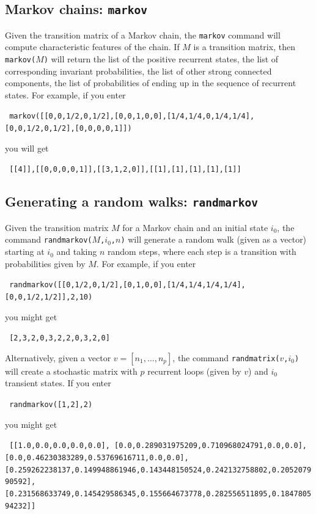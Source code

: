 \documentclass[a4paper,11pt]{book}
\begin{document}
\subsection{Markov chains: \texttt{markov}}

Given the transition matrix of a Markov chain, the \texttt{markov}
command will compute characteristic features of the chain.  If $M$ is
a transition matrix, then \texttt{markov($M$)} will return the list of
the positive recurrent states, the list of corresponding
invariant probabilities, the list of other strong connected
components, the list of probabilities of ending up in the sequence of
recurrent states. 
For example, if you enter
\begin{center}
  \tt
  markov([[0,0,1/2,0,1/2],[0,0,1,0,0],[1/4,1/4,0,1/4,1/4],[0,0,1/2,0,1/2],[0,0,0,0,1]])
\end{center}
you will get
\begin{center}
  \tt
  [[4]],[[0,0,0,0,1]],[[3,1,2,0]],[[1],[1],[1],[1],[1]]
\end{center}

\subsection{Generating a random walks: \texttt{randmarkov}}

Given the transition matrix $M$ for a Markov chain and an initial
state $i_0$, the command \texttt{randmarkov($M$,$i_0$,$n$)} will
generate a random walk (given as a vector) starting at $i_0$ and
taking $n$ random steps, where each step is a transition with
probabilities given by $M$.  For example, if you enter
\begin{center}
  \tt
  randmarkov([[0,1/2,0,1/2],[0,1,0,0],[1/4,1/4,1/4,1/4],[0,0,1/2,1/2]],2,10)
\end{center}
you might get
\begin{center}
  \tt
  [2,3,2,0,3,2,2,0,3,2,0]  
\end{center}

Alternatively, given a vector $v = [n_1,\dots,n_p]$, the command
\texttt{randmatrix($v$,$i_0$)} will create a stochastic matrix with
$p$ recurrent loops (given by $v$) and $i_0$ transient states.  If you
enter
\begin{center}
  \tt
  randmarkov([1,2],2)
\end{center}
you might get
\begin{center}
  \tt
   [[1.0,0.0,0.0,0.0,0.0],
    [0.0,0.289031975209,0.710968024791,0.0,0.0],
    [0.0,0.46230383289,0.53769616711,0.0,0.0],
    [0.259262238137,0.149948861946,0.143448150524,0.242132758802,0.205207990592],
    [0.231568633749,0.145429586345,0.155664673778,0.282556511895,0.184780594232]]      
\end{center}
\end{document}
